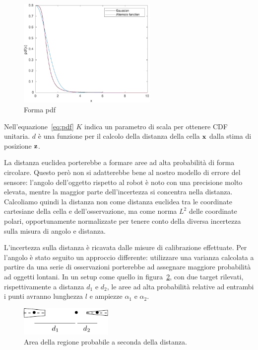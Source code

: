 \documentclass[a4paper]{article}
\begin{document}
	\begin{figure}[H]
		\centering
		\includegraphics[width=0.6\textwidth]{./img/pdf_shape.pdf}
		\caption{Forma pdf}
		\label{fig:pdf_shape}
	\end{figure}

	Nell'equazione~\ref{eq:pdf} $K$ indica un parametro di scala per ottenere
	CDF unitaria. $d$ è una funzione per il calcolo della distanza della cella
	${\bf x}$ dalla stima di posizione ${\bf z}$.

	La distanza euclidea porterebbe a formare aree ad alta probabilità di forma
	circolare. Questo però non si adatterebbe bene al nostro modello di errore
	del sensore: l'angolo dell'oggetto rispetto al robot è noto con una
	precisione molto elevata, mentre la maggior parte dell'incertezza si
	concentra nella distanza. Calcoliamo quindi la distanza non come distanza
	euclidea tra le coordinate cartesiane della cella e dell'osservazione, ma
	come norma $L^2$ delle coordinate polari, opportunamente normalizzate per
	tenere conto della diversa incertezza sulla misura di angolo e distanza.

	L'incertezza sulla distanza è ricavata dalle misure di calibrazione
	effettuate. Per l'angolo è stato seguito un approccio differente:
	utilizzare una varianza calcolata a partire da una serie di osservazioni
	porterebbe ad assegnare maggiore probabilità ad oggetti lontani.  In un
	setup come quello in figura~\ref{fig:circular_sector}, con due target
	rilevati, rispettivamente a distanza $d_1$ e $d_2$, le aree ad alta
	probabilità relative ad entrambi i punti avranno lunghezza $l$ e ampiezze $
	\alpha_1 \text{ e } \alpha_2  $. 
	
	\begin{figure}[b]
		\centering
		\includegraphics[width=0.4\textwidth]{img/circular_sector.pdf}
		\caption{Area della regione probabile a seconda della distanza.}
		\label{fig:circular_sector}
	\end{figure}
\end{document}
